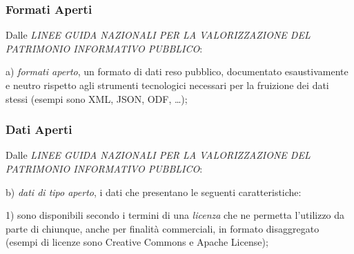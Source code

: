 \documentclass[8pt]{beamer}
\begin{document}
\begin{frame}
\frametitle{Formati Aperti}

Dalle \emph{LINEE GUIDA NAZIONALI PER LA VALORIZZAZIONE DEL PATRIMONIO
INFORMATIVO PUBBLICO}:
\vspace{\baselineskip}

a) \emph{formati aperto}, un formato di dati reso pubblico, documentato
esaustivamente e neutro rispetto agli strumenti tecnologici necessari per la fruizione dei dati stessi (esempi sono
XML, JSON, ODF, \ldots);

\end{frame}

\begin{frame}
\frametitle{Dati Aperti}

Dalle \emph{LINEE GUIDA NAZIONALI PER LA VALORIZZAZIONE DEL PATRIMONIO
INFORMATIVO PUBBLICO}:
\vspace{\baselineskip}

b) \emph{dati di tipo aperto}, i dati che presentano le seguenti caratteristiche:
\vspace{\baselineskip}

1) sono disponibili secondo i termini di una \emph{licenza} che ne permetta
l'utilizzo da parte di chiunque, anche per finalit\`a commerciali, in formato
disaggregato (esempi di licenze sono Creative Commons e Apache License);
\vspace{\baselineskip}

\vspace{\baselineskip}

\vspace{\baselineskip}

\vspace{\baselineskip}


\end{frame}
\end{document}
